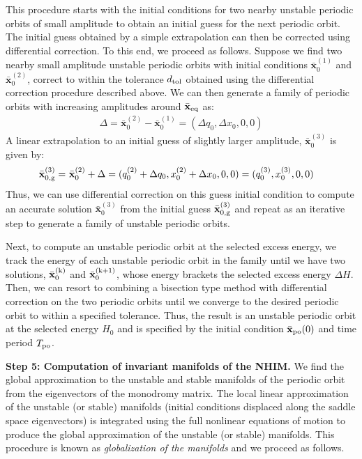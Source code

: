 \documentclass{ws-ijbc}
\begin{document}
This procedure starts with the initial conditions for two nearby unstable periodic orbits of small amplitude to obtain an initial guess for the next periodic orbit. The initial guess obtained by a simple extrapolation can then be corrected using differential correction. To this end, we proceed as follows. Suppose we find two nearby small amplitude unstable periodic orbits with initial conditions $\bar{\mathbf{x}}_0^{(1)}$ and $\bar{\mathbf{x}}_0^{(2)}$, correct to within the tolerance $d_{\rm tol}$ obtained using the differential correction procedure described above. We can then generate a family of periodic orbits with increasing amplitudes around $\bar{\mathbf{x}}_{\rm eq}$ as:
% 
\begin{align}
\Delta = \bar{\mathbf{x}}_0^{(2)} - \bar{\mathbf{x}}_0^{(1)} 
= (\Delta q_0, \Delta x_0, 0, 0)		
\end{align}
A linear extrapolation to an initial guess of slightly larger amplitude, 
$\bar{\mathbf{x}}_0^{(3)}$ is given by:
\begin{align}
\bar{\mathbf{x}}_{\rm 0,g}^{(3)} =&~\bar{\mathbf{x}}_0^{(2)} + \Delta = (q_0^{(2)} + \Delta q_0,x_0^{(2)} + \Delta x_0,0,0) = (q_0^{(3)},x_0^{(3)},0,0)
\end{align}
Thus, we can use differential correction on this guess initial condition to compute an accurate solution $\bar{\mathbf{x}}_0^{(3)}$ from the initial guess $\bar{\mathbf{x}}_{\rm 0,g}^{(3)}$ and repeat as an iterative step to generate a family of unstable periodic orbits. 

Next, to compute an unstable periodic orbit at the selected excess energy, we track the energy of each unstable periodic orbit in the family until we have two solutions, $\bar{\mathbf{x}}_0^{\rm (k)}$ and $\bar{\mathbf{x}}_0^{\rm (k+1)}$, whose energy brackets the selected excess energy $\Delta H$. Then, we can resort to combining a bisection type method with differential correction on the two periodic orbits until we converge to the desired periodic orbit to within a specified 
tolerance. Thus, the result is an unstable periodic orbit at the selected energy $H_0$ and is specified by the initial condition $\bar{\mathbf{x}}_{\rm po}(0)$ and time period $T_{\rm po}$. 

\textbf{Step 5: Computation of invariant manifolds of the NHIM.} We find the global 
approximation to the unstable and stable manifolds of the periodic orbit from the eigenvectors of the monodromy matrix. The local linear approximation of the unstable (or stable) manifolds (initial conditions displaced along the saddle space eigenvectors) is integrated using the full nonlinear equations of motion to produce the global approximation of the unstable (or stable) manifolds. This procedure is known as \textit{globalization of the manifolds} and we proceed as follows.
\end{document}
